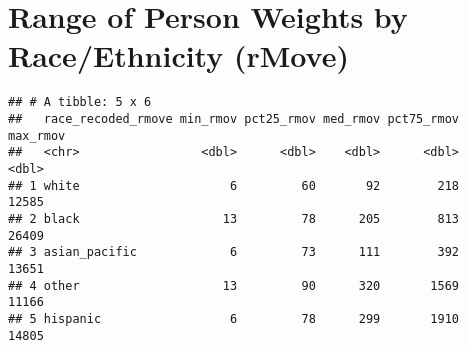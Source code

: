 \documentclass[
]{article}
\begin{document}
\section{Range of Person Weights by Race/Ethnicity
(rMove)}\label{range-of-person-weights-by-raceethnicity-rmove}

\begin{verbatim}
## # A tibble: 5 x 6
##   race_recoded_rmove min_rmov pct25_rmov med_rmov pct75_rmov max_rmov
##   <chr>                 <dbl>      <dbl>    <dbl>      <dbl>    <dbl>
## 1 white                     6         60       92        218    12585
## 2 black                    13         78      205        813    26409
## 3 asian_pacific             6         73      111        392    13651
## 4 other                    13         90      320       1569    11166
## 5 hispanic                  6         78      299       1910    14805
\end{verbatim}
\end{document}
